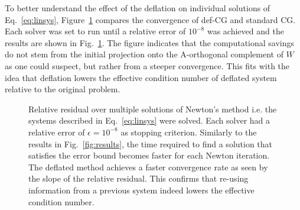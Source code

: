\documentclass{article}
\newlength{\figheight}
\newlength{\figwidth}
\begin{document}
To better understand the effect of the deflation on individual solutions of Eq.~\eqref{eq:linsys}, Figure~\ref{fig:comparison} compares the convergence of def-CG and standard CG. Each solver was set to run until a relative error of $10^{-8}$ was achieved and the results are shown in Fig.~\ref{fig:comparison}. The figure indicates that the computational savings do not stem from the initial projection onto the A-orthogonal complement of $W$ as one could suspect, but rather from a steeper convergence. This fits with the idea that deflation lowers the effective condition number of deflated system relative to the original problem. 




\setlength{\figwidth}{.99\textwidth}
\setlength{\figheight}{0.41803398875\figwidth}

\begin{figure}[b]
    \centering \scriptsize
        
    \caption{\label{fig:comparison}Relative residual over multiple solutions of Newton's method i.e. the systems described in Eq.~\eqref{eq:linsys} were solved. Each solver had a relative error of $\epsilon=10^{-8}$ as stopping criterion. Similarly to the results in Fig.~\ref{fig:results}, the time required to find a solution that satisfies the error bound becomes faster for each Newton iteration. The deflated method achieves a faster convergence rate as seen by the slope of the relative residual. This confirms that re-using information from a previous system indeed lowers the effective condition number.}

\end{figure}
\setlength{\figwidth}{.9\textwidth}
\end{document}
